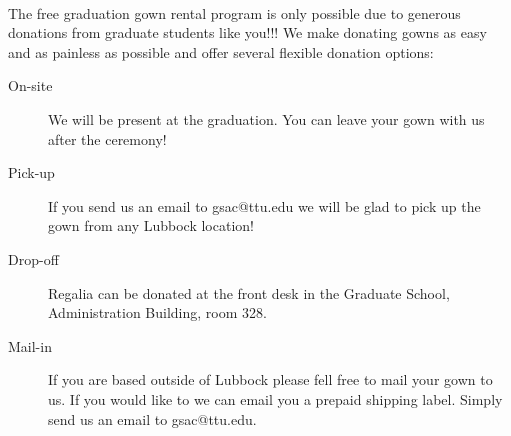 \documentclass{tufte-handout}
\begin{document}
~\\
\noindent The free graduation gown rental program is only possible due to generous donations from graduate students like you!!! We make donating gowns as easy and as painless as possible and offer several flexible donation options:

\begin{description}
\item[On-site] We will be present at the graduation. You can leave your  gown with us after the ceremony!
\item[Pick-up] If you send us an email to gsac@ttu.edu we will be glad to pick up the gown from any Lubbock location!
\item[Drop-off] Regalia can be donated at the front desk in the Graduate School, Administration Building, room 328.
\item[Mail-in] If you are based outside of Lubbock please fell free to mail your gown to us. If you would like to we can email you a prepaid shipping label. Simply send us an email to gsac@ttu.edu.
\end{description}
\end{document}
